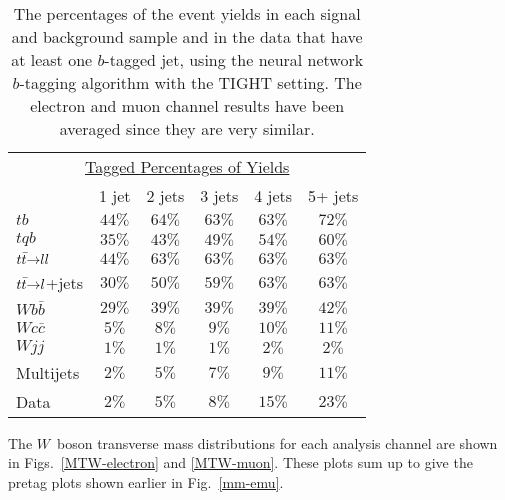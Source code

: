 \begin{table}[!h!tbp]
\begin{center}
\begin{minipage}{3.5in}
\begin{ruledtabular}
\begin{tabular}{l||ccccc}
\multicolumn{6}{c}{\hspace{0.5in}\underline{Tagged Percentages of Yields}}
\vspace{0.1in} \\
                         & 1 jet & 2 jets & 3 jets & 4 jets & 5+ jets \\
\hline
$tb$                   & $44\%$ & $64\%$ & $63\%$ & $63\%$ & $72\%$ \\
$tqb$                  & $35\%$ & $43\%$ & $49\%$ & $54\%$ & $60\%$ \\
${\mbox{$t\bar{t}$}}{\rightarrow}ll$     & $44\%$ & $63\%$ & $63\%$ & $63\%$ & $63\%$ \\
${\mbox{$t\bar{t}$}}{\rightarrow}l$+jets & $30\%$ & $50\%$ & $59\%$ & $63\%$ & $63\%$ \\
$Wb\bar{b}$            & $29\%$ & $39\%$ & $39\%$ & $39\%$ & $42\%$ \\
$Wc\bar{c}$            & $ 5\%$ & $ 8\%$ & $ 9\%$ & $10\%$ & $11\%$ \\
$Wjj$                  & $ 1\%$ & $ 1\%$ & $ 1\%$ & $ 2\%$ & $ 2\%$ \\
Multijets              & $ 2\%$ & $ 5\%$ & $ 7\%$ & $ 9\%$ & $11\%$ \\
Data                   & $ 2\%$ & $ 5\%$ & $ 8\%$ & $15\%$ & $23\%$
\end{tabular}
\end{ruledtabular}
\vspace{-0.1in}
\caption[taggedpercent]{The percentages of the event yields in
each signal and background sample and in the data that have at least
one $b$-tagged jet, using the neural network $b$-tagging algorithm
with the TIGHT setting. The electron and muon channel results have
been averaged since they are very similar.}
\label{tagged-percent}
\end{minipage}
\end{center}
\end{table}

\clearpage

The $W$~boson transverse mass distributions for each analysis channel
are shown in Figs.~\ref{MTW-electron} and \ref{MTW-muon}. These plots
sum up to give the pretag plots shown earlier in Fig.~\ref{mm-emu}.

